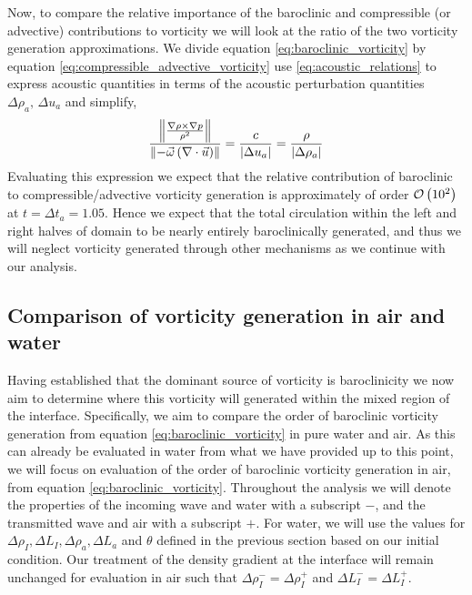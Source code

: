 Now, to compare the relative importance of the baroclinic and
compressible (or advective) contributions to vorticity we will look at
the ratio of the two vorticity generation approximations. We divide
equation \eqref{eq:baroclinic_vorticity} by equation
\eqref{eq:compressible_advective_vorticity} use
\eqref{eq:acoustic_relations} to express acoustic quantities in terms
of the acoustic perturbation quantities $\Delta \rho_a,\,\Delta u_a$ and simplify,
\begin{align} \label{eq:vorticity_comparison}
\frac{\norm{\frac{\nabla\rho\times\nabla p}{\rho^2}}}{\norm{-\vec{\omega}\left(\nabla\cdot\vec{u}\right)}} = \frac{c}{\abs{\Delta u_a}} = \frac{\rho}{\abs{\Delta \rho_a}}%
\end{align}
Evaluating this expression we expect that the relative contribution of
baroclinic to compressible/advective vorticity generation is
approximately of order $\mathcal{O}\left(10^2\right)$ at
$t=\Delta t_a=1.05$. Hence we expect that the total circulation within
the left and right halves of domain to be nearly entirely
baroclinically generated, and thus we will neglect vorticity generated
through other mechanisms as we continue with our analysis.

\subsection{Comparison of vorticity generation in air and water}
Having established that the dominant source of vorticity is
baroclinicity we now aim to determine where this vorticity will
generated within the mixed region of the interface. Specifically, we
aim to compare the order of baroclinic vorticity generation from
equation \eqref{eq:baroclinic_vorticity} in pure water and air. As
this can already be evaluated in water from what we have provided up
to this point, we will focus on evaluation of the order of baroclinic
vorticity generation in air, from equation
\eqref{eq:baroclinic_vorticity}. Throughout the analysis we will
denote the properties of the incoming wave and water with a subscript
$-$, and the transmitted wave and air with a subscript $+$. For water,
we will use the values for
$\Delta \rho_I, \Delta L_I, \Delta \rho_a, \Delta L_a$ and $\theta$
defined in the previous section based on our initial condition. Our
treatment of the density gradient at the interface will remain
unchanged for evaluation in air such that
$\Delta \rho_I^-=\Delta \rho_I^+$ and $\Delta L_I^-=\Delta L_I^+$.

